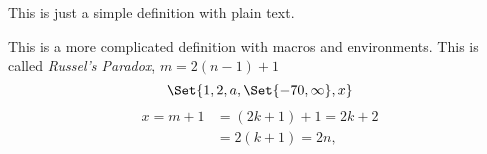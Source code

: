 \begin{SaveDefinition}[
    key=DefinitionWithText,
    title={Definition With Only Text}
]
This is just a simple definition with plain text.
\end{SaveDefinition}
\begin{SaveDefinition}[
    key=MoreComplicatedDefinition,
    title={Definition With Macros, Environments etc.}
]
This is a more complicated definition with macros and environments.
This is called \emph{Russel's Paradox},
$m=2(n-1)+1$
\[
	\Set{1,2,a,\Set{-70,\infty}, x}
\]
\begin{align*}
    x=m+1&=(2k+1)+1=2k+2\\
    &=2(k+1)=2n,
\end{align*}
\end{SaveDefinition}